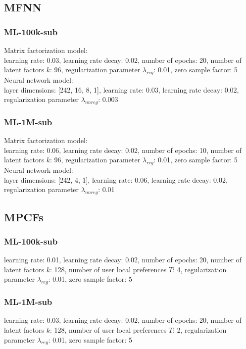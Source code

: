 \subsection{MFNN}
\subsubsection{ML-100k-sub}
Matrix factorization model:\\
learning rate: 0.03, learning rate decay: 0.02, number of epochs: 20, number of latent factors $k$: 96, regularization parameter $\lambda_{reg}$: 0.01, zero sample factor: 5 \\
Neural network model:\\
layer dimensions: [242, 16, 8, 1], learning rate: 0.03, learning rate decay: 0.02, regularization parameter $\lambda_{nnreg}$: 0.003


\subsubsection{ML-1M-sub}
Matrix factorization model:\\
learning rate: 0.06, learning rate decay: 0.02, number of epochs: 10, number of latent factors $k$: 96, regularization parameter $\lambda_{reg}$: 0.01, zero sample factor: 5 \\
Neural network model:\\
layer dimensions: [242, 4, 1], learning rate: 0.06, learning rate decay: 0.02, regularization parameter $\lambda_{nnreg}$: 0.01


\subsection{MPCFs}
\subsubsection{ML-100k-sub}
learning rate: 0.01, learning rate decay: 0.02, number of epochs: 20, number of latent factors $k$: 128, number of user local preferences $T$: 4, regularization parameter $\lambda_{reg}$: 0.01, zero sample factor: 5

\subsubsection{ML-1M-sub}
learning rate: 0.03, learning rate decay: 0.02, number of epochs: 20, number of latent factors $k$: 128, number of user local preferences $T$: 2, regularization parameter $\lambda_{reg}$: 0.01, zero sample factor: 5


